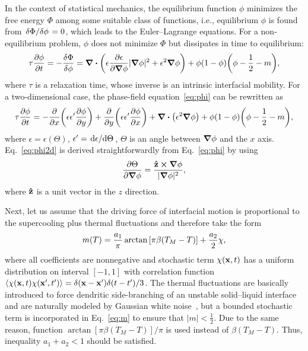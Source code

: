 \documentclass{article}
\begin{document}
In the context of statistical mechanics, the equilibrium function $\phi$ minimizes the free energy $\Phi$
among some suitable class of functions, i.e., equilibrium $\phi$ is found from $\fdv*{\Phi}{\phi} = 0$,
which leads to the Euler--Lagrange equations.
For a non-equilibrium problem, $\phi$ does not minimize $\Phi$ but dissipates in time to equilibrium:
\begin{equation}\label{eq:phi}
    \tau\pdv{\phi}{t} = -\fdv{\Phi}{\phi}
        = \div( \epsilon\pdv{\epsilon}{\grad\phi}|\grad\phi|^2 + \epsilon^2\grad\phi)
        + \phi(1-\phi)\qty(\phi - \frac12 - m),
\end{equation}
where $\tau$ is a relaxation time, whose inverse is an intrinsic interfacial mobility.
For a two-dimensional case, the phase-field equation~\eqref{eq:phi} can be rewritten as
\begin{equation}\label{eq:phi2d}
    \tau\pdv{\phi}{t} =
        - \pdv{x}\qty(\epsilon\epsilon'\pdv{\phi}{y})
        + \pdv{y}\qty(\epsilon\epsilon'\pdv{\phi}{x})
        + \div(\epsilon^2\grad\phi)
        + \phi(1-\phi)\qty(\phi - \frac12 - m),
\end{equation}
where $\epsilon=\epsilon(\Theta)$, $\epsilon' = \dv*{\epsilon}{\Theta}$,
$\Theta$ is an angle between $\grad\phi$ and the $x$ axis.
Eq.~\eqref{eq:phi2d} is derived straightforwardly from Eq.~\eqref{eq:phi} by using
\begin{equation}\label{eq:Dtheta}
    \pdv{\Theta}{\grad\phi} = \frac{\vu{z}\cross\grad\phi}{|\grad\phi|^2},
\end{equation}
where $\vu{z}$ is a unit vector in the $z$ direction.

Next, let us assume that the driving force of interfacial motion is proportional to the supercooling
plus thermal fluctuations and therefore take the form
\begin{equation}\label{eq:m}
    m(T) = \frac{a_1}{\pi}\arctan\qty[\pi\beta(T_M-T)] + \frac{a_2}{2}\chi,
\end{equation}
where all coefficients are nonnegative and stochastic term $\chi(\vb{x},t)$
has a uniform distribution on interval $[-1,1]$
with correlation function $\langle\chi(\vb{x},t)\chi(\vb{x}',t')\rangle = \delta(\vb{x}-\vb{x}')\delta(t-t')/3$.
The thermal fluctuations are basically introduced
to force dendritic side-branching of an unstable solid--liquid interface
and are naturally modeled by Gaussian white noise~\cite{karma1993fluctuations},
but a bounded stochastic term is incorporated in Eq.~\eqref{eq:m} to ensure that $|m|<\frac12$.
Due to the same reason, function $\arctan[\pi\beta(T_M-T)]/\pi$ is used instead of $\beta(T_M-T)$.
Thus, inequality $a_1+a_2<1$ should be satisfied.
\end{document}
